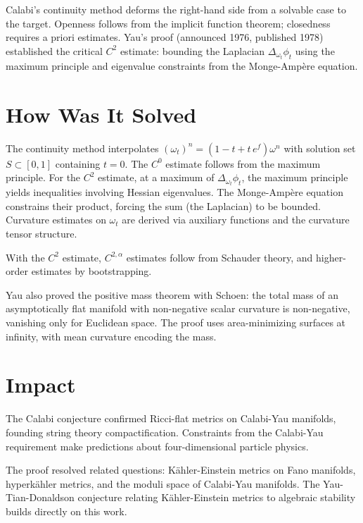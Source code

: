Calabi's continuity method deforms the right-hand side from a solvable
case to the target. Openness follows from the implicit function theorem;
closedness requires a priori estimates. Yau's proof (announced 1976, \cite{yau1978}
published 1978) established the critical $C^2$ estimate: bounding the
Laplacian $\Delta_{\omega_t} \phi_t$ using the maximum principle and
eigenvalue constraints from the Monge-Amp\`{e}re equation.

\section*{How Was It Solved}

The continuity method interpolates $(\omega_t)^n = (1 - t + t \, e^f)
\omega^n$ with solution set $S \subset [0,1]$ containing $t=0$. The
$C^0$ estimate follows from the maximum principle. For the $C^2$
estimate, at a maximum of $\Delta_{\omega_t} \phi_t$, the maximum
principle yields inequalities involving Hessian eigenvalues. The
Monge-Amp\`{e}re equation constrains their product, forcing the sum
(the Laplacian) to be bounded. Curvature estimates on $\omega_t$ are
derived via auxiliary functions and the curvature tensor structure.

With the $C^2$ estimate, $C^{2,\alpha}$ estimates follow from Schauder
theory, and higher-order estimates by bootstrapping.

Yau also proved the positive mass theorem with Schoen: the total mass
of an asymptotically flat manifold with non-negative scalar curvature is
non-negative, vanishing only for Euclidean space. The proof uses
area-minimizing surfaces at infinity, with mean curvature encoding the
mass.

\section*{Impact}

The Calabi conjecture confirmed Ricci-flat metrics on Calabi-Yau
manifolds, founding string theory compactification. Constraints from the
Calabi-Yau requirement make predictions about four-dimensional particle
physics.

The proof resolved related questions: K\"{a}hler-Einstein metrics on Fano
manifolds, hyperk\"{a}hler metrics, and the moduli space of Calabi-Yau
manifolds. The Yau-Tian-Donaldson conjecture relating K\"{a}hler-Einstein
metrics to algebraic stability builds directly on this work.

